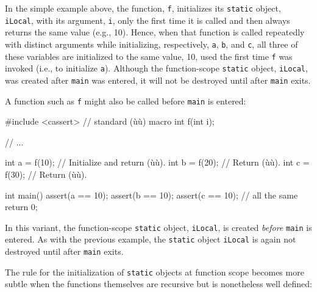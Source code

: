 \noindent In the simple example above, the function, \lstinline!f!, initializes its
\lstinline!static! object, \lstinline!iLocal!, with its argument, \lstinline!i!, only
the first time it is called and then always returns the same value
(e.g., 10). Hence, when that function is called repeatedly with distinct
arguments while initializing, respectively, \lstinline!a!, \lstinline!b!, and
\lstinline!c!, all three of these variables are initialized to the same
value, 10, used the first time \lstinline!f! was invoked (i.e., to
initialize \lstinline!a!). Although the function-scope \lstinline!static!
object, \lstinline!iLocal!, was created after \lstinline!main! was entered, it
will not be destroyed until after \lstinline!main! exits.

A function such as \lstinline!f! might also be called before \lstinline!main!
is entered:

\begin{emcppshiddenlisting}[emcppsbatch=e1]
#include <cassert>  // standard (ù{}ù) macro
int f(int i);
\end{emcppshiddenlisting}
\begin{emcppslisting}[emcppsbatch=e1]
// ...

int a = f(10);  // Initialize and return (ù{}ù).
int b = f(20);  // Return (ù{}ù).
int c = f(30);  // Return (ù{}ù).

int main()
{
    assert(a == 10);  assert(b == 10);  assert(c == 10);  // all the same
    return 0;
}
\end{emcppslisting}

\noindent In this variant, the function-scope \lstinline!static! object,
\lstinline!iLocal!, is created \emph{before} \lstinline!main! is entered. As
with the previous example, the \lstinline!static! object
\lstinline!iLocal! is again not destroyed until after \lstinline!main! exits.

The rule for the initialization of \lstinline!static! objects at function
scope becomes more subtle when the functions themselves are recursive
but is nonetheless well defined:

